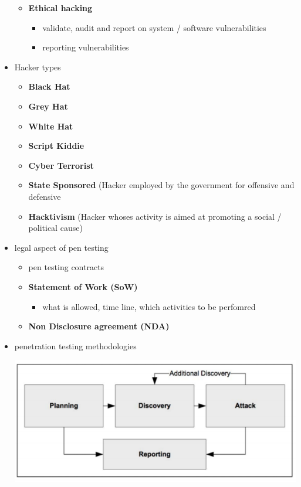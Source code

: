 \documentclass[11pt,twoside,landscape]{article}
\begin{document}
\begin{multicols}{4}
\begin{itemize}
\begin{itemize}
\item \textbf{Ethical hacking}
\begin{itemize}
\item validate, audit and report on system / software vulnerabilities
\item reporting vulnerabilities
\end{itemize}
\end{itemize}

\item Hacker types
\begin{itemize}
\item \textbf{Black Hat}
\item \textbf{Grey Hat}
\item \textbf{White Hat}
\item \textbf{Script Kiddie}
\item \textbf{Cyber Terrorist}
\item \textbf{State Sponsored} (Hacker employed by the government for offensive and defensive
\item \textbf{Hacktivism} (Hacker whoses activity is aimed at promoting a social / political cause)
\end{itemize}

\item legal aspect of pen testing
\begin{itemize}
\item pen testing contracts
\item \textbf{Statement of Work (SoW)}
\begin{itemize}
\item what is allowed, time line, which activities to be perfomred
\end{itemize}
\item \textbf{Non Disclosure agreement (NDA)}
\end{itemize}

\item penetration testing methodologies
\begin{center}
\includegraphics[width=.9\linewidth]{static/img/cysec/penetration_testing_methodologies.png}
\end{center}


\end{itemize}
\end{multicols}
\end{document}
